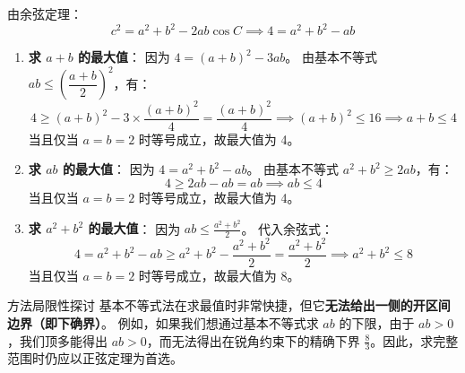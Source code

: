 \documentclass[11pt, a4paper]{ctexart}
\begin{document}
由余弦定理：
\[
c^2 = a^2+b^2 - 2ab\cos C \implies 4 = a^2+b^2 - ab
\]

\begin{enumerate}
  \item \textbf{求 $a+b$ 的最大值}：
    因为 $4 = (a+b)^2 - 3ab$。
    由基本不等式 $ab \le \left(\dfrac{a+b}{2}\right)^2$，有：
    \[
    4 \ge (a+b)^2 - 3 \times \frac{(a+b)^2}{4} = \frac{(a+b)^2}{4} \implies (a+b)^2 \le 16 \implies a+b \le 4
    \]
    当且仅当 $a = b = 2$ 时等号成立，故最大值为 4。

  \item \textbf{求 $ab$ 的最大值}：
    因为 $4 = a^2+b^2 - ab$。
    由基本不等式 $a^2+b^2 \ge 2ab$，有：
    \[
    4 \ge 2ab - ab = ab \implies ab \le 4
    \]
    当且仅当 $a = b = 2$ 时等号成立，故最大值为 4。

  \item \textbf{求 $a^2+b^2$ 的最大值}：
    因为 $ab \le \frac{a^2+b^2}{2}$。
    代入余弦式：
    \[
    4 = a^2+b^2 - ab \ge a^2+b^2 - \frac{a^2+b^2}{2} = \frac{a^2+b^2}{2} \implies a^2+b^2 \le 8
    \]
    当且仅当 $a = b = 2$ 时等号成立，故最大值为 8。
\end{enumerate}

\begin{conceptbox}{方法局限性探讨}
基本不等式法在求最值时非常快捷，但它\textbf{无法给出一侧的开区间边界（即下确界）}。
例如，如果我们想通过基本不等式求 $ab$ 的下限，由于 $ab > 0$，我们顶多能得出 $ab > 0$，而无法得出在锐角约束下的精确下界 $\frac{8}{3}$。因此，求完整范围时仍应以正弦定理为首选。
\end{conceptbox}
\end{document}
